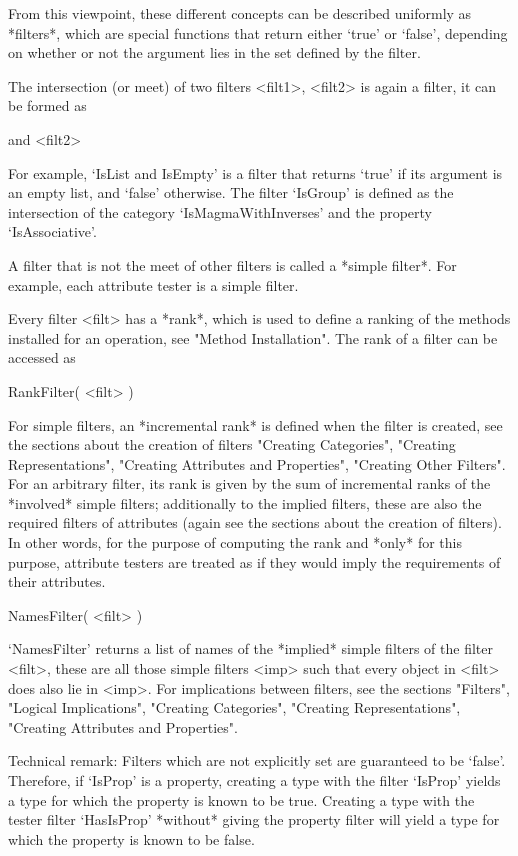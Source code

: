{}From this viewpoint, these different concepts can be described
uniformly as *filters*,
which are special {\GAP} functions that return either `true' or `false',
depending on whether or not the argument lies in the set defined by the
filter.

The intersection (or meet) of two filters <filt1>, <filt2> is again a
filter,
it can be formed as

 and <filt2>

For example, `IsList and IsEmpty' is a filter that returns `true'
if its argument is an empty list, and `false' otherwise.
The filter `IsGroup' is defined as the intersection of the category
`IsMagmaWithInverses' and the property `IsAssociative'.

A filter that is not the meet of other filters
is called a *simple filter*.
For example, each attribute tester is a simple filter.

Every filter <filt> has a *rank*, which is used to define a ranking of
the methods installed for an operation, see "Method Installation".
The rank of a filter can be accessed as

\>RankFilter( <filt> )

For simple filters, an *incremental rank* is defined when the filter is
created, see the sections about the creation of filters
"Creating Categories", "Creating Representations",
"Creating Attributes and Properties", "Creating Other Filters".
For an arbitrary filter, its rank is given by the sum of incremental
ranks of the *involved* simple filters;
additionally to the implied filters, these are also the required filters
of attributes (again see the sections about the creation of filters).
In other words, for the purpose of computing the rank and *only* for this
purpose, attribute testers are treated as if they would imply the
requirements of their attributes.

\>NamesFilter( <filt> )

`NamesFilter' returns a list of names of the *implied* simple filters
of the filter <filt>, these are all those simple filters <imp> such that
every object in <filt> does also lie in <imp>.
For implications between filters, see the sections "Filters",
"Logical Implications", "Creating Categories",
"Creating Representations", "Creating Attributes and Properties".

Technical remark:
Filters which are not explicitly set are guaranteed to be `false'.
Therefore, if `IsProp' is a property, creating a type with the filter
`IsProp' yields a type for which the property is known to be true. Creating
a type with the tester filter `HasIsProp' *without* giving the property
filter will yield a type for which the property is known to be false.

